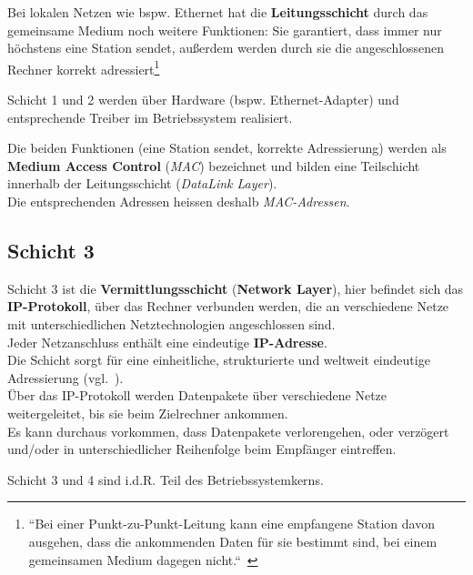 \noindent
Bei lokalen Netzen wie {bspw.} Ethernet hat die \textbf{Leitungsschicht} durch das gemeinsame Medium noch weitere Funktionen: Sie garantiert, dass immer nur höchstens eine Station sendet, außerdem werden durch sie die angeschlossenen Rechner korrekt adressiert\footnote{
``Bei einer Punkt-zu-Punkt-Leitung kann eine empfangene Station davon ausgehen, dass die ankommenden Daten für sie bestimmt sind, bei einem gemeinsamen Medium dagegen nicht.``~\cite[257]{Oec22}
}

\begin{tcolorbox}
    Schicht 1 und 2 werden über Hardware ({bspw.} Ethernet-Adapter) und entsprechende Treiber im Betriebssystem realisiert.
\end{tcolorbox}

\noindent
Die beiden Funktionen (eine Station sendet, korrekte Adressierung) werden als \textbf{Medium Access Control} (\textit{MAC}) bezeichnet und bilden eine Teilschicht innerhalb der Leitungsschicht (\textit{DataLink Layer}).\\
Die entsprechenden Adressen heissen deshalb \textit{MAC-Adressen}.

\subsection*{Schicht 3}
Schicht 3 ist die \textbf{Vermittlungsschicht} (\textbf{Network Layer}), hier befindet sich das \textbf{IP-Protokoll}, über das Rechner verbunden werden, die an verschiedene Netze mit unterschiedlichen Netztechnologien angeschlossen sind.\\

\noindent
Jeder Netzanschluss enthält eine eindeutige \textbf{IP-Adresse}.\\
Die Schicht sorgt für eine einheitliche, strukturierte und weltweit eindeutige Adressierung (vgl.~\cite[258]{Oec22}).\\

\noindent
Über das IP-Protokoll werden Datenpakete über verschiedene Netze weitergeleitet, bis sie beim Zielrechner ankommen.\\

\noindent
Es kann durchaus vorkommen, dass Datenpakete verlorengehen, oder verzögert und/oder in unterschiedlicher Reihenfolge beim Empfänger eintreffen.


\begin{tcolorbox}
    Schicht 3 und 4 sind i.d.R. Teil des Betriebssystemkerns.
\end{tcolorbox}


